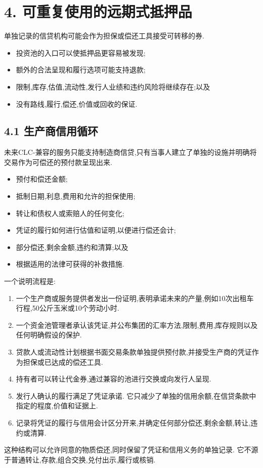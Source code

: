 \documentclass[11pt]{article}
\begin{document}
\section*{4. 可重复使用的远期式抵押品}

单独记录的信贷机构可能会作为担保或偿还工具接受可转移的券.

\begin{itemize}[leftmargin=*]
\item 投资池的入口可以使抵押品更容易被发现;
\item 额外的合法呈现和履行选项可能支持退款;
\item 限制,库存,估值,流动性,发行人业绩和违约风险将继续存在;以及
\item 没有路线,履行,偿还,价值或回收的保证.
\end{itemize}
\subsection*{4.1 生产商信用循环}

未来CLC-兼容的服务只能支持制造商信贷,只有当事人建立了单独的设施并明确将交易作为可偿还的预付款呈现出来.

\begin{itemize}[leftmargin=*]
\item 预付和偿还金额;
\item 抵制日期,利息,费用和允许的担保使用;
\item 转让和债权人或索赔人的任何变化;
\item 凭证的履行如何进行估值和证明,以便进行偿还会计;
\item 部分偿还,剩余金额,违约和清算;以及
\item 根据适用的法律可获得的补救措施.
\end{itemize}
一个说明流程是:

\begin{enumerate}[leftmargin=*]
\item 一个生产商或服务提供者发出一份证明,表明承诺未来的产量,例如10次出租车行程,50公斤玉米或10个劳动小时.
\item 一个资金池管理者承认该凭证,并公布集团的汇率方法,限制,费用,库存规则以及任何明确假设的保护.
\item 贷款人或流动性计划根据书面交易条款单独提供预付款,并接受生产商的凭证作为担保或已达成的偿还工具.
\item 持有者可以转让代金券,通过兼容的池进行交换或向发行人呈现.
\item 发行人确认的履行满足了凭证承诺. 它只减少了单独的信用余额,在信贷条款中指定的程度,价值和证据上.
\item 记录将凭证的履行与信用会计区分开来,并确定任何部分偿还,剩余金额,转让,违约或清算.
\end{enumerate}
这种结构可以允许同意的物质偿还,同时保留了凭证和信用义务的单独记录. 它不源于普通转让,存款,组合交换,兑付出示,履行或核销.
\end{document}

